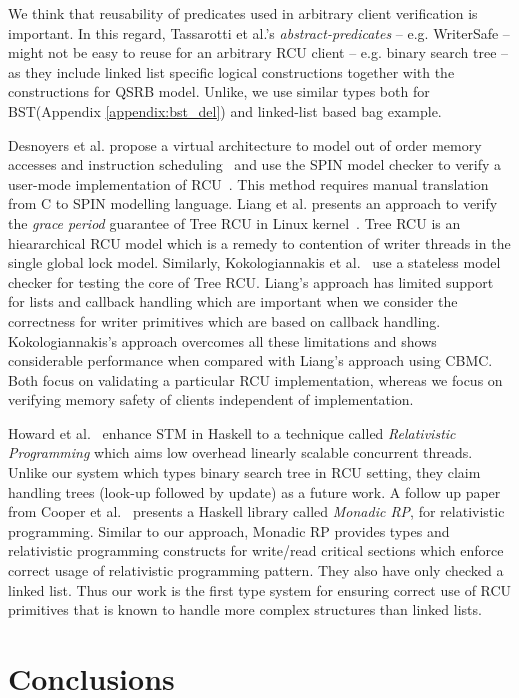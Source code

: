  We think that reusability of predicates used in arbitrary client verification is important. In this regard, Tassarotti et al.'s \textit{abstract-predicates} -- e.g. WriterSafe -- might not be easy to reuse for an arbitrary RCU client -- e.g. binary search tree -- as they include linked list specific logical constructions together with the constructions for QSRB model. Unlike, we use similar types both for BST(Appendix \ref{appendix:bst_del}) and linked-list based bag example.

Desnoyers et al. propose a virtual architecture to model out of order memory accesses and instruction scheduling~\cite{Desnoyers:2013:MSM:2506164.2506174} and use the \textsf{SPIN} model checker to verify a user-mode implementation of RCU~\cite{urcu_ieee}. This method requires manual translation from C to SPIN modelling language.
Liang et al. presents an approach to verify the \emph{grace period} guarantee of \textsf{Tree RCU} in Linux kernel~\cite{LiangMKM16}. \textsf{Tree RCU} is an hieararchical \textsf{RCU} model which is a remedy to contention of writer threads in the single global lock model. 
Similarly, Kokologiannakis et al.~\cite{Kokologiannakis:2017:SMC:3092282.3092287} use a stateless model checker for testing the core of \textsf{Tree RCU}.
Liang's approach has limited support for lists and callback handling which are important when we consider the correctness for writer primitives which are based on callback handling. Kokologiannakis's approach overcomes all these limitations and shows considerable performance when compared with Liang's approach using \textsf{CBMC}. 
Both focus on validating a particular RCU implementation, whereas we focus on verifying memory safety of clients independent of implementation.
 
Howard et al.~\cite{Howard:2011:RES:2001252.2001267} enhance \textsf{STM} in Haskell to a technique called \textit{Relativistic Programming} which aims low overhead linearly scalable concurrent threads. Unlike our system which types binary search tree in \textsf{RCU} setting, they claim  handling trees (look-up followed by update) as a future work.
A follow up paper from Cooper et al.~\cite{Cooper2015RelativisticPI} presents a \textsf{Haskell} library called \emph{Monadic RP}, for relativistic programming. Similar to our approach, Monadic RP provides types and relativistic programming constructs for write/read critical sections which enforce correct usage of relativistic programming pattern. 
They also have only checked a linked list.
Thus our work is the first type system for ensuring correct use of RCU primitives that is known to handle more complex structures than linked lists.
\section{Conclusions}
\label{sec:concls}
